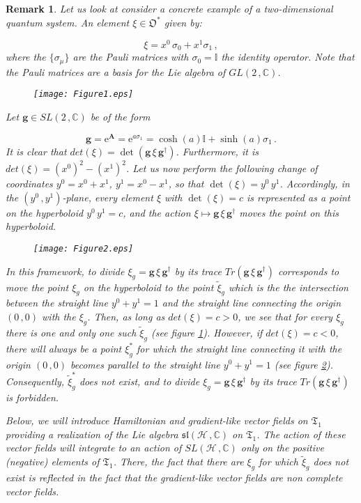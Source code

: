 \documentclass[11pt]{article}
\newcommand{\be}{\begin{equation}}
\newcommand{\ee}{\end{equation}}
\newcommand{\obsp}{\mathfrak{O}}
\newtheorem{rem}{Remark}
\begin{document}
\begin{rem}
Let us look at consider a concrete example of a two-dimensional quantum system.
An element $\xi\in\obsp^{*}$ given by:

\be
\xi=x^{0}\,\sigma_{0} + x^{1}\sigma_{1}\,,
\ee
where the $\{\sigma_{\mu}\}$ are the Pauli matrices with $\sigma_{0}=\mathbb{I}$ the identity operator.
Note that the Pauli matrices are a basis for the Lie algebra of $GL(2\,,\mathbb{C})$.

\begin{figure}[h!]
\centering
\texttt{[image: Figure1.eps]}
\caption{\textit{}}
\label{Figure1}
\end{figure}

Let $\mathbf{g}\in SL(2\,,\mathbb{C})$ be of the form

\be
\mathbf{g}=\mathrm{e}^{\mathbf{A}}=\mathrm{e}^{a\sigma_{1}}=\cosh(a)\mathbb{I} + \sinh(a)\sigma_{1}\,.
\ee
It is clear that $det(\xi)=\det(\mathbf{g}\,\xi\,\mathbf{g}^{\dagger})$.
Furthermore, it is $det(\xi)=(x^{0})^{2} - (x^{1})^{2}$.
Let us now perform the following change of coordinates $y^{0}=x^{0} + x^{1}$, $y^{1}=x^{0} - x^{1}$, so that $\det(\xi)=y^{0}\,y^{1}$.
Accordingly, in the $(y^{0}\,,y^{1})$-plane,  every  element $\xi$ with $\det(\xi)=c$ is represented as a point on the hyperboloid $y^{0}\,y^{1}=c$, and the action $\xi\mapsto \mathbf{g}\,\xi\,\mathbf{g}^{\dagger}$ moves the point on this hyperboloid.



\begin{figure}[h!]
\centering
\texttt{[image: Figure2.eps]}
\caption{\textit{}}
\label{Figure2}
\end{figure}

In this framework, to divide $\xi_{g}=\mathbf{g}\,\xi\,\mathbf{g}^{\dagger}$ by its trace $Tr(\mathbf{g}\,\xi\,\mathbf{g}^{\dagger})$ corresponds to move the point $\xi_{g}$ on the hyperboloid to the point $\widetilde{\xi}_{g}$ which is the  the intersection between the straight line $y^{0} + y^{1}=1$ and the straight line connecting the origin $(0\,,0)$ with the $\xi_{g}$.
Then, as long as $det(\xi)=c>0$, we see that for every $\xi_{g}$ there is one and only one such $\widetilde{\xi}_{g}$ (see figure \ref{Figure1}).
However, if $det(\xi)=c<0$, there will always be a point $\xi_{g}^{*}$ for which the straight line connecting it with the origin $(0\,,0)$ becomes parallel to the straight line $y^{0} + y^{1}=1$ (see figure \ref{Figure2}).
Consequently, $\widetilde{\xi}_{g}^{*}$ does not exist, and to divide $\xi_{g}=\mathbf{g}\,\xi\,\mathbf{g}^{\dagger}$ by its trace $Tr(\mathbf{g}\,\xi\,\mathbf{g}^{\dagger})$ is forbidden.

Below, we will introduce Hamiltonian and gradient-like vector fields on $\mathfrak{T}_{1}$ providing a realization of the Lie algebra $\mathfrak{sl}(\mathcal{H}\,,\mathbb{C})$ on $\mathfrak{T}_{1}$.
The action of these vector fields will integrate to an action of $SL(\mathcal{H}\,,\mathbb{C})$ only on the positive (negative) elements of $\mathfrak{T}_{1}$.
There, the fact that there are $\xi_{g}$ for which $\widetilde{\xi}_{g}$ does not exist is reflected in the fact that the gradient-like vector fields are non complete vector fields.
\end{rem}
\end{document}
